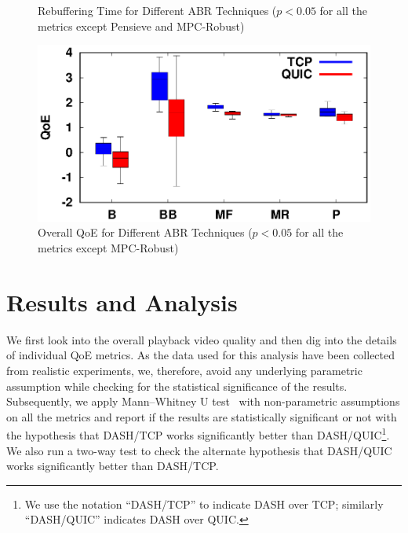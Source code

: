 \begin{figure}[!t]
\begin{minipage}[t]{0.23\linewidth}
		\caption{\label{fig:RebufferTime_n}Rebuffering Time for Different ABR Techniques ($p<0.05$ for all the metrics except Pensieve and MPC-Robust)}
	\end{minipage}\hfill
	\begin{minipage}[t]{0.23\linewidth}
		\includegraphics[width=\linewidth]{img/newexp/qoe_box}
		\caption{\label{fig:QOE_n}Overall QoE for Different ABR Techniques ($p<0.05$ for all the metrics except MPC-Robust)}
	\end{minipage}
\end{figure}

\section{Results and Analysis}
We first look into the overall playback video quality and then dig into the details of individual QoE metrics. As the data used for this analysis have been collected from realistic experiments, we, therefore, avoid any underlying parametric assumption while checking for the statistical significance of the results. Subsequently, we apply Mann–Whitney U test~\cite{mannwhitney} with non-parametric assumptions on all the metrics and report if the results are statistically significant or not with the hypothesis that DASH/TCP works significantly better than DASH/QUIC\footnote{We use the notation ``DASH/TCP'' to indicate DASH over TCP; similarly ``DASH/QUIC'' indicates DASH over QUIC.}. We also run a two-way test to check the alternate hypothesis that DASH/QUIC works significantly better than DASH/TCP.




